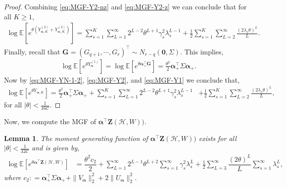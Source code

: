 \documentclass[11pt,reqno]{amsart}
\numberwithin{equation}{section}
\newtheorem{lemma}{Lemma}[section]
\theoremstyle{definition}
\begin{document}
\begin{proof}
Combining \eqref{eq:MGF-Y2-nz} and \eqref{eq:MGF-Y2-z} we can conclude that for all $K \geq 1$,
\begin{align}\label{eq:MGF-Y2}
    \log\mathbb{E}\left[ e^{\theta (Y_{\bm \alpha, K}^{(2)} + Y_{\bm \alpha, K}^{(3)} ) } \right]  = \sum_{s=1}^{K}\sum_{L=1}^{\infty}2^{L-2}\theta^{L+1}\gamma_{s}^{2}\lambda_{s}^{L-1} 
    + \frac{1}{2}\sum_{s=1}^{K}\sum_{L=2}^{\infty}\frac{(2\lambda_{s} \theta)^{L}}{L} . 
\end{align}
Finally, recall that $\bm{G} = (G_{q+1},\cdots, G_{r})^{\top}\sim N_{r-q}(\bm{0},\Sigma)$. This implies, 
\begin{align}\label{eq:MGF-Y1}
    \log\mathbb{E}\left[ e^{\theta Y_{\bm \alpha}^{(1)}} \right] = \log\mathbb{E}\left[ e^{\theta \bm{\alpha}_{+}^{\top}\bm{G} } \right] = \frac{\theta^{2}}{2}\bm{\alpha}_{+}^{\top}\Sigma\bm{\alpha}_{+}.
\end{align} 
Now by \eqref{eq:MGF-YN-1-2}, \eqref{eq:MGF-Y2}, and \eqref{eq:MGF-Y1} we conclude that,
\begin{align*}
    \log\mathbb{E}\left[ e^{\theta Y_{\bm \alpha, K}} \right] = \frac{\theta^{2}}{2}\bm{\alpha}_{+}^{\top}\Sigma\bm{\alpha}_{+} + \sum_{s=1}^{K}\sum_{L=1}^{\infty}2^{L-2}\theta^{L+1}\gamma_{s}^{2}\lambda_{s}^{L-1}
    & + \frac{1}{2}\sum_{s=1}^{K}\sum_{L=2}^{\infty}\frac{(2\lambda_{s} \theta)^{L}}{L} , 
\end{align*}
for all $|\theta|<\frac{1}{16\mathcal{C}}$. 
\end{proof}


Now, we compute the MGF of $\bm{\alpha}^{\top}\bm{Z}(\bm{\mathcal{H}},W))$. 

\begin{lemma}\label{lemma:MGF-limit-1st}
The moment generating function of $\bm{\alpha}^{\top}\bm{Z}(\bm{\mathcal{H}},W))$ exists for all $|\theta|<\frac{1}{32\mathcal{C}}$ and is given by,
\begin{align}\label{eq:YMGFlimit}
    \log\mathbb{E}\left[ e^{\theta \bm{\alpha}^{\top}\bm{Z}(\bm{\mathcal{H}},W)} \right] 
    &= \dfrac{\theta^{2} c_2}{2}  + \sum_{L = 1}^{\infty} 2^{L-1}\theta^{L+2} \sum_{s=1}^{\infty} \gamma_{s}^{2}\lambda_{s}^{L} + \frac{1}{2}\sum_{L=3}^{\infty}\dfrac{\left(2 \theta\right)^{L}}{L} \sum_{s=1}^{\infty} \lambda_{s}^L , 
\end{align}  
where $c_2: = \bm{\alpha}_{+}^{\top}\Sigma\bm{\alpha}_{+} + \|V_{\bm \alpha}\|_2^2 + 2 \| U_{\bm \alpha} \|_2^2$. 
\end{lemma}
\end{document}
